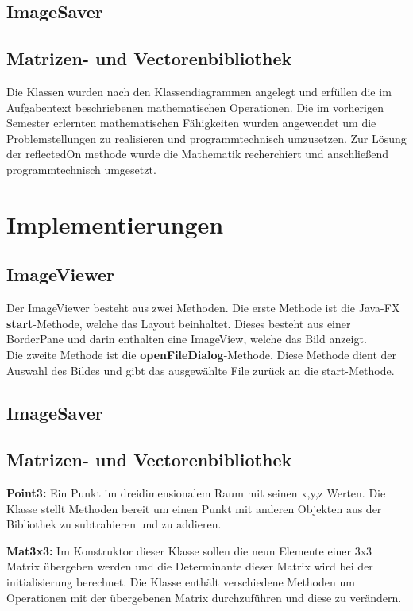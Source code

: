 \documentclass[a4paper,10pt]{ltxdoc}
\begin{document}
\subsection{ImageSaver}

\subsection{Matrizen- und Vectorenbibliothek}
Die Klassen wurden nach den Klassendiagrammen angelegt und erfüllen die im Aufgabentext beschriebenen mathematischen Operationen. Die im vorherigen Semester erlernten mathematischen Fähigkeiten  wurden angewendet um die Problemstellungen zu realisieren und programmtechnisch umzusetzen. Zur Lösung der reflectedOn methode wurde die Mathematik recherchiert und anschließend programmtechnisch umgesetzt.

\section{Implementierungen}
\subsection{ImageViewer}
Der ImageViewer besteht aus zwei Methoden. Die erste Methode ist die Java-FX \textbf{start}-Methode, welche das Layout beinhaltet. Dieses besteht aus einer BorderPane und darin enthalten eine ImageView, welche das Bild anzeigt. \\
Die zweite Methode ist die \textbf{openFileDialog}-Methode. Diese Methode dient der Auswahl des Bildes und gibt das ausgewählte File zurück an die start-Methode.
\subsection{ImageSaver}

\subsection{Matrizen- und Vectorenbibliothek}

\textbf{Point3:} Ein Punkt im dreidimensionalem Raum mit seinen x,y,z Werten. Die Klasse stellt Methoden bereit um einen Punkt mit anderen Objekten aus der Bibliothek zu subtrahieren und zu addieren.

\textbf{Mat3x3:} Im Konstruktor dieser Klasse sollen die neun Elemente einer 3x3 Matrix übergeben werden und die Determinante dieser Matrix wird bei der initialisierung berechnet. Die Klasse enthält verschiedene Methoden um Operationen mit der übergebenen Matrix durchzuführen und diese zu verändern. 
\end{document}
